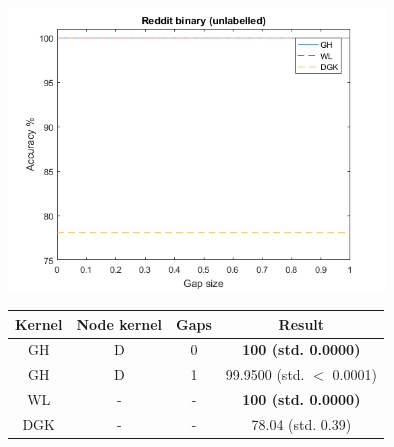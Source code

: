 \documentclass{article}
\begin{document}
\begin{minipage}{0.6\linewidth}
	\hspace*{-1in}
	\includegraphics[width=10cm]{reddit_binary_unlabelled}
	\label{fig:reddit_binary_unlabelled}
\end{minipage}
\begin{minipage}[c]{0.5\linewidth}
	
	\centering
	\begin{tabular}{c|c|c|c}
		Kernel & Node kernel & Gaps & Result\\
		\hline
		GH & D & 0 & \textbf{100 (std. 0.0000)}\\
		GH & D & 1 & 99.9500 (std. $<$ 0.0001)\\
		WL & - & - & \textbf{100 (std. 0.0000)}\\
		DGK\cite{yanardag} & - & - & 78.04 (std. 0.39)
	\end{tabular}
	\label{table:reddit_binary_unlabelled}
\end{minipage}
\end{document}

